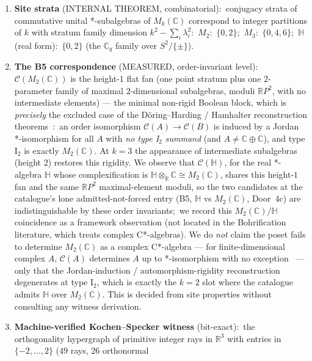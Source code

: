 \documentclass[11pt,a4paper]{article}
\theoremstyle{plain}
\theoremstyle{definition}
\newcommand{\R}{\mathbb{R}}
\newcommand{\C}{\mathbb{C}}
\newcommand{\HH}{\mathbb{H}}
\begin{document}
\begin{enumerate}\setlength{\itemsep}{1pt}
  \item \textbf{Site strata} (INTERNAL THEOREM, combinatorial):\
    conjugacy strata of commutative unital *-subalgebras of $M_k(\C)$
    correspond to integer partitions of $k$ with stratum family
    dimension $k^2 - \sum_i \lambda_i^2$:\ $M_2$:\ $\{0, 2\}$;\
    $M_3$:\ $\{0, 4, 6\}$;\ $\HH$ (real form):\ $\{0, 2\}$ (the
    $\C_q$ family over $S^2/\{\pm\}$).
  \item \textbf{The B5 correspondence} (MEASURED, order-invariant
    level):\ $\mathcal{C}(M_2(\C))$ is the height-$1$ flat fan (one
    point stratum plus one $2$-parameter family of maximal
    $2$-dimensional subalgebras, moduli $\R P^2$, with no intermediate
    elements) --- the minimal non-rigid Boolean block, which is
    \emph{precisely} the excluded case of the D\"oring--Harding /
    Hamhalter reconstruction theorems~\cite{doring_harding2016,%
    hamhalter2011}:\ an order isomorphism $\mathcal{C}(A) \to
    \mathcal{C}(B)$ is induced by a Jordan *-isomorphism for all $A$
    with \emph{no type I$_2$ summand} (and $A \ne \C \oplus \C$), and
    type I$_2$ is exactly $M_2(\C)$.  At $k = 3$ the appearance of
    intermediate subalgebras (height $2$) restores this rigidity.  We
    observe that $\mathcal{C}(\HH)$, for the real *-algebra $\HH$ whose
    complexification is $\HH \otimes_\R \C \cong M_2(\C)$, shares this
    height-$1$ fan and the same $\R P^2$ maximal-element moduli, so the
    two candidates at the catalogue's lone admitted-not-forced entry
    (B5, $\HH$ vs $M_2(\C)$, Door~4c) are indistinguishable by these
    order invariants;\ we record this $M_2(\C)/\HH$ coincidence as a
    framework observation (not located in the Bohrification literature,
    which treats complex C*-algebras).  We do \emph{not} claim the
    poset fails to determine $M_2(\C)$ as a complex C*-algebra --- for
    finite-dimensional complex $A$, $\mathcal{C}(A)$ determines $A$ up
    to *-isomorphism with no exception~\cite{lindenhovius2015} --- only
    that the Jordan-induction / automorphism-rigidity reconstruction
    degenerates at type I$_2$, which is exactly the $k = 2$ slot where
    the catalogue admits $\HH$ over $M_2(\C)$.  This is decided from
    site properties without consulting any witness derivation.
  \item \textbf{Machine-verified Kochen--Specker witness} (bit-exact):\
    the orthogonality hypergraph of primitive integer rays in $\R^3$
    with entries in $\{-2, \ldots, 2\}$ ($49$ rays, $26$ orthonormal

\end{enumerate}
\end{document}
